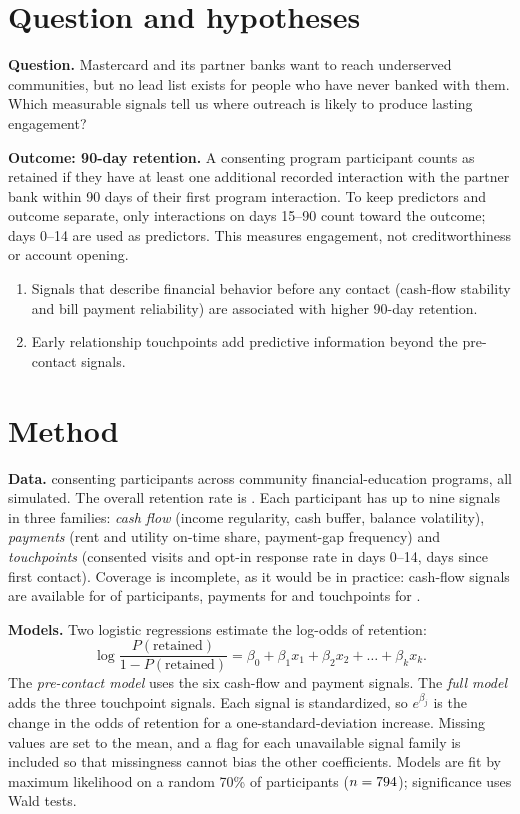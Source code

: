 \documentclass[11pt]{article}
\begin{document}
\section{Question and hypotheses}

\textbf{Question.} Mastercard and its partner banks want to reach underserved communities, but no
lead list exists for people who have never banked with them. Which measurable signals tell us
where outreach is likely to produce lasting engagement?

\textbf{Outcome: 90-day retention.} A consenting program participant counts as retained if they
have at least one additional recorded interaction with the partner bank within 90 days of their
first program interaction. To keep predictors and outcome separate, only interactions on days
15--90 count toward the outcome; days 0--14 are used as predictors. This measures engagement, not
creditworthiness or account opening.

\begin{enumerate}[label=\textbf{H\arabic*.}]
  \item Signals that describe financial behavior before any contact (cash-flow stability and bill
        payment reliability) are associated with higher 90-day retention.
  \item Early relationship touchpoints add predictive information beyond the pre-contact signals.
\end{enumerate}

\section{Method}

\textbf{Data.} \Nparticipants{} consenting participants across \Nprograms{} community
financial-education programs, all simulated. The overall retention rate is \BaseRate. Each
participant has up to nine signals in three families: \emph{cash flow} (income regularity, cash
buffer, balance volatility), \emph{payments} (rent and utility on-time share, payment-gap
frequency) and \emph{touchpoints} (consented visits and opt-in response rate in days 0--14, days
since first contact). Coverage is incomplete, as it would be in practice: cash-flow signals are
available for \CovCashflow{} of participants, payments for \CovPayments{} and touchpoints for
\CovTouchpoints.

\textbf{Models.} Two logistic regressions estimate the log-odds of retention:
\[
  \log\frac{P(\text{retained})}{1-P(\text{retained})}
  = \beta_0 + \beta_1 x_1 + \beta_2 x_2 + \dots + \beta_k x_k .
\]
The \emph{pre-contact model} uses the six cash-flow and payment signals. The \emph{full model}
adds the three touchpoint signals. Each signal is standardized, so $e^{\beta_j}$ is the change in
the odds of retention for a one-standard-deviation increase. Missing values are set to the mean,
and a flag for each unavailable signal family is included so that missingness cannot bias the
other coefficients. Models are fit by maximum likelihood on a random 70\% of participants
($n=794$); significance uses Wald tests.
\end{document}
